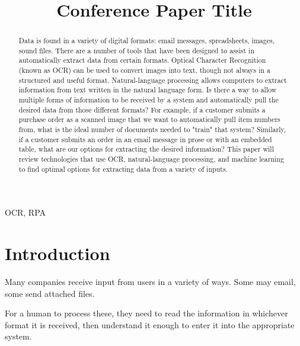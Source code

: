 \documentclass[conference]{IEEEtran}
\begin{document}
\title{Conference Paper Title}

\author{
}

\maketitle

\begin{abstract}
Data is found in a variety of digital formats: email messages, spreadsheets, images, sound files. There are a number of tools that have been designed to assist in automatically extract data from certain formats. Optical Character Recognition (known as OCR) can be used to convert images into text, though not always in a structured and useful format. Natural-language processing allows computers to extract information from text written in the natural language form. Is there a way to allow multiple forms of information to be received by a system and automatically pull the desired data from those different formats? For example, if a customer submits a purchase order as a scanned image that we want to automatically pull item numbers from, what is the ideal number of documents needed to "train" that system? Similarly, if a customer submits an order in an email message in prose or with an embedded table, what are our options for extracting the desired information? This paper will review technologies that use OCR, natural-language processing, and machine learning to find optimal options for extracting data from a variety of inputs.
\end{abstract}

\begin{IEEEkeywords}
OCR, RPA
\end{IEEEkeywords}

\section{Introduction}
Many companies receive input from users in a variety of ways. Some may email, some send attached files.

For a human to process these, they need to read the information in whichever format it is received, then understand it enough to enter it into the appropriate system.
\end{document}
